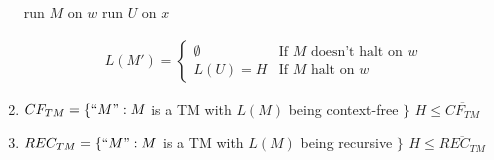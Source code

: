 \begin{enumerate}
    \begin{algorithm}[H]
        \caption{$M'$}
        \begin{algorithmic}
            \State run $M$ on $w$
            \State run $U$ on $x$
        \end{algorithmic}
    \end{algorithm}
    \begin{align*}
        L(M')=\left\{ \begin{array}{ll}
            \emptyset & \text{If $M$ doesn't halt on } w\\
            L(U)=H & \text{If $M$ halt on } w
        \end{array} \right.
    \end{align*}
    \item $CF_{TM}=\{ ``M": M$ is a TM with $L(M)$ being context-free $ \}$
    \subitem $H\le \overline{CF_{TM}}$
    \item $REC_{TM}=\{``M": M$ is a TM with $L(M)$ being recursive $\}$
    \subitem $H\le \overline{REC_{TM}}$
\end{enumerate}

